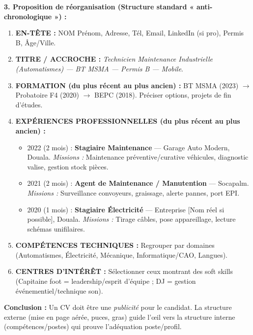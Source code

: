 \documentclass[11pt]{article}
\newcommand{\cle}[1]{{\popxbold\color{popdark}#1}}
\newcounter{popsec}
\newcounter{popsub}
\newcommand{\courssub}[1]{%
  \stepcounter{popsub}%
  \par\vspace{9pt}\noindent{\popxbold\fontsize{11.5}{13}\selectfont\color{popink}{\color{poporange}\thepopsec.\thepopsub}\hspace{6pt}#1}\par\nopagebreak\vspace{4pt}
}
\begin{document}
\begin{exoresolu}
    \textbf{3. Proposition de réorganisation (Structure standard « anti-chronologique ») :}
    \begin{enumerate}
        \item \textbf{EN-TÊTE :} NOM Prénom, Adresse, Tél, Email, LinkedIn (si pro), Permis B, Âge/Ville.
        \item \textbf{TITRE / ACCROCHE :} \emph{Technicien Maintenance Industrielle (Automatismes) — BT MSMA — Permis B — Mobile}.
        \item \textbf{FORMATION (du plus récent au plus ancien) :} BT MSMA (2023) $\rightarrow$ Probatoire F4 (2020) $\rightarrow$ BEPC (2018). Préciser options, projets de fin d'études.
        \item \textbf{EXPÉRIENCES PROFESSIONNELLES (du plus récent au plus ancien) :}
              \begin{itemize}
                  \item 2022 (2 mois) : \textbf{Stagiaire Maintenance} — Garage Auto Modern, Douala. \textit{Missions :} Maintenance préventive/curative véhicules, diagnostic valise, gestion stock pièces.
                  \item 2021 (2 mois) : \textbf{Agent de Maintenance / Manutention} — Socapalm. \textit{Missions :} Surveillance convoyeurs, graissage, alerte pannes, port EPI.
                  \item 2020 (1 mois) : \textbf{Stagiaire Électricité} — Entreprise [Nom réel si possible], Douala. \textit{Missions :} Tirage câbles, pose appareillage, lecture schémas unifilaires.
              \end{itemize}
        \item \textbf{COMPÉTENCES TECHNIQUES :} Regrouper par domaines (Automatismes, Électricité, Mécanique, Informatique/CAO, Langues).
        \item \textbf{CENTRES D'INTÉRÊT :} Sélectionner ceux montrant des \cle{soft skills} (Capitaine foot = leadership/esprit d'équipe ; DJ = gestion événementiel/technique son).
    \end{enumerate}

    \textbf{Conclusion :} Un CV doit être une \emph{publicité} pour le candidat. La structure externe (mise en page aérée, puces, gras) guide l'œil vers la structure interne (compétences/postes) qui prouve l'adéquation poste/profil.
\end{exoresolu}

\courssub{Structure externe du CV}
\end{document}
